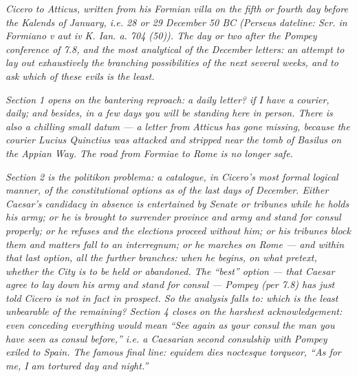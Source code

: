 
\textit{Cicero to Atticus, written from his Formian villa on
the fifth or fourth day before the Kalends of January, i.e.
28 or 29 December 50 BC (Perseus dateline:
\textit{Scr. in Formiano v aut iv K. Ian. a. 704 (50)}). The
day or two after the Pompey conference of 7.8, and the most
analytical of the December letters: an attempt to lay out
exhaustively the branching possibilities of the next several
weeks, and to ask which of these evils is the least.}

\textit{Section 1 opens on the bantering reproach: a daily
letter? if I have a courier, daily; and besides, in a few
days you will be standing here in person. There is also a
chilling small datum --- a letter from Atticus has gone
missing, because the courier Lucius Quinctius was attacked
and stripped near the tomb of Basilus on the Appian Way. The
road from Formiae to Rome is no longer safe.}

\textit{Section 2 is the \emph{politikon problema}: a
catalogue, in Cicero's most formal logical manner, of the
constitutional options as of the last days of December.
Either Caesar's candidacy in absence is entertained by
Senate or tribunes while he holds his army; or he is brought
to surrender province and army and stand for consul properly;
or he refuses and the elections proceed without him; or his
tribunes block them and matters fall to an interregnum; or
he marches on Rome --- and within that last option, all the
further branches: when he begins, on what pretext, whether
the City is to be held or abandoned. The ``best'' option ---
that Caesar agree to lay down his army and stand for consul
--- Pompey (per 7.8) has just told Cicero is not in fact in
prospect. So the analysis falls to: which is the least
unbearable of the remaining? Section 4 closes on the harshest
acknowledgement: even conceding everything would mean
``See again as your consul the man you have seen as consul
before,'' i.e. a Caesarian second consulship with Pompey
exiled to Spain. The famous final line: \textit{equidem
dies noctesque torqueor}, ``As for me, I am tortured day
and night.''}
